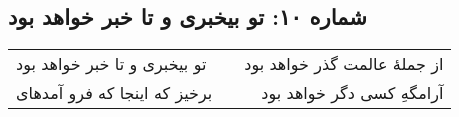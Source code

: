 \begin{center}
\section*{شماره ۱۰: تو بیخبری و تا خبر خواهد بود}
\label{sec:010}
\begin{longtable}{l p{0.5cm} r}
تو بیخبری و تا خبر خواهد بود
&&
از جملهٔ عالمت گذر خواهد بود
\\
برخیز که اینجا که فرو آمدهای
&&
آرامگهِ کسی دگر خواهد بود
\\
\end{longtable}
\end{center}
